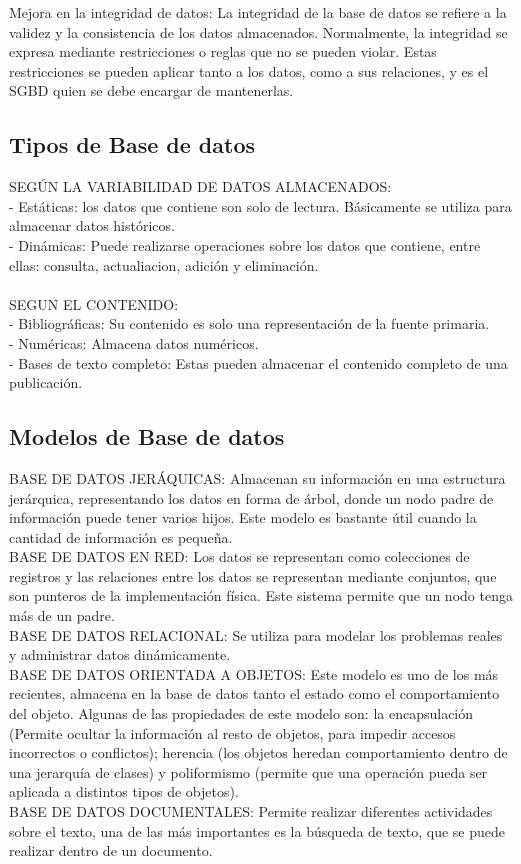 Mejora en la integridad de datos: La integridad de la base de datos se refiere a la validez y la consistencia de los datos almacenados. Normalmente, la integridad se expresa mediante restricciones o reglas que no se pueden violar. Estas restricciones se pueden aplicar tanto a los datos, como a sus relaciones, y es el SGBD quien se debe encargar de mantenerlas.

\subsection{Tipos de Base de datos}
SEGÚN LA VARIABILIDAD DE DATOS ALMACENADOS: \\
- Estáticas: los datos que contiene son solo de lectura. Básicamente se utiliza para almacenar datos históricos.\\
- Dinámicas: Puede realizarse operaciones sobre los datos que contiene, entre ellas: consulta, actualiacion, adición y eliminación.\\\\
SEGUN EL CONTENIDO: \\
- Bibliográficas: Su contenido es solo una representación de la fuente primaria.\\
- Numéricas: Almacena datos numéricos.\\
- Bases de texto completo: Estas pueden almacenar el contenido completo de una publicación.

\subsection{Modelos de Base de datos}
BASE DE DATOS JERÁQUICAS: Almacenan su información en una estructura jerárquica, representando los datos en forma de árbol, donde un nodo padre de información puede tener varios hijos. Este modelo es bastante útil cuando la cantidad de información es pequeña.\\

BASE DE DATOS EN RED: Los datos se representan como colecciones de registros y las relaciones entre los datos se representan mediante conjuntos, que son punteros de la implementación física. Este sistema permite que un nodo tenga más de un padre.\\

BASE DE DATOS RELACIONAL: Se utiliza para modelar los problemas reales y administrar datos dinámicamente. \\

BASE DE DATOS ORIENTADA A OBJETOS: Este modelo es uno de los más recientes, almacena en la base de datos tanto el estado como el comportamiento del objeto. Algunas de las propiedades de este modelo son: la encapsulación (Permite ocultar la información al resto de objetos, para impedir accesos incorrectos o conflictos); herencia (los objetos heredan comportamiento dentro de una jerarquía de clases) y poliformismo (permite que una operación pueda ser aplicada a distintos tipos de objetos). \\

BASE DE DATOS DOCUMENTALES: Permite realizar diferentes actividades sobre el texto, una de las más importantes es la búsqueda de texto, que se puede realizar dentro de un documento.



